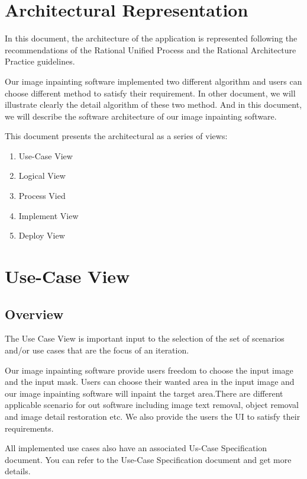 \documentclass[12pt]{article}
\begin{document}
\section{Architectural Representation}
\qquad In this document, the architecture of the application is represented following the recommendations of the Rational Unified Process and the Rational Architecture Practice guidelines. 

Our image inpainting software implemented two different algorithm and users can choose different method to satisfy their requirement. In other document, we will illustrate clearly the detail algorithm of these two method. And in this document, we will describe the software architecture of our image inpainting software.

This document presents the architectural as a series of views:

\begin{enumerate}
	\item Use-Case View
	\item Logical View
	\item Process Vied
	\item Implement View
	\item Deploy View
\end{enumerate}


\section{Use-Case View}
\subsection{Overview}
\qquad The Use Case View is important input to the selection of the set of scenarios and/or use cases that are the focus of an iteration. 

Our image inpainting software provide users freedom to choose the input image and the input mask. Users can choose their wanted area in the input image and our image inpainting software will inpaint the target area.There are different applicable scenario for out software including image text removal, object removal and image detail restoration etc. We also provide the users the UI to satisfy their requirements. 

All implemented use cases also have an associated Us-Case Specification document. You can refer to the Use-Case Specification document and get more details.
\end{document}
